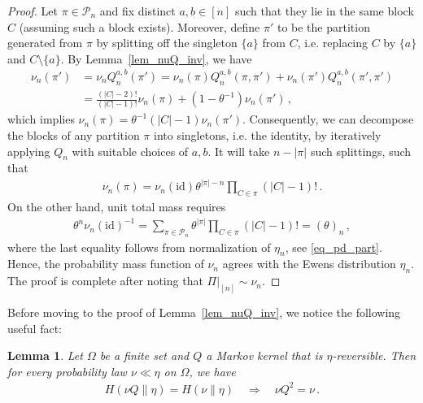 \documentclass[a4paper,11pt]{article}
\newcommand{\mP}{\mathcal{P}}
\numberwithin{equation}{section}
\newtheorem{lemma}[theorem]{Lemma}
\begin{document}
\begin{proof}
	Let $ \pi \in \mP_{n}$ and fix distinct $ a, b \in [n]$ such that they lie in the same block $C$ (assuming such a block exists). Moreover, define $ \pi' $ to be the partition generated from $ \pi$ by splitting off the singleton $\{a\}$ from $C$, i.e. replacing $ C$ by $ \{a\} $ and $C \setminus \{a\}$.
	By Lemma~\ref{lem_nuQ_inv}, we have 
	\begin{equation*}
	\begin{aligned}
	\nu_{n} ( \pi') 
	&= \nu_{n} Q^{a,b}_{n}( \pi') = 
	\nu_{n} ( \pi ) Q^{a,b}_{n} ( \pi, \pi'  )
	+	\nu_{n} ( \pi' ) Q^{a,b}_{n} ( \pi', \pi'  )\\
	&= 
	\frac{ (|C|-2)!}{(|C|-1)!}
	\nu_{n} ( \pi)
	+
	( 1- \theta^{-1})
	\nu_{n} ( \pi' )\,,
	\end{aligned}
	\end{equation*}
	which implies $ \nu_{n} ( \pi)= \theta^{-1} (|C|-1) \nu_{n}( \pi' )$.
	Consequently, we can decompose the blocks of any partition $ \pi$ into singletons, i.e. the identity, by iteratively applying $ Q_{n}$ with suitable choices of $a,b$. It will take $ n - | \pi|$ such splittings, such that 
\begin{equation*}
\begin{aligned}
	\nu_{n}( \pi)
	=
	\nu_{n} ( \mathrm{id})
	\theta^{| \pi| -n }
	\prod_{C  \in \pi} ( |C| -1)!	
  \,.
\end{aligned}
\end{equation*}
On the other hand, 
unit total mass requires 
\begin{equation*}
\begin{aligned}
\theta^{n} \nu_{n}( \mathrm{id})^{-1} 
= \sum_{\pi \in \mP_{n}} \theta^{ | \pi |} \prod_{C \in \pi}(|C| -1)!
= ( \theta)_{n} \,,
\end{aligned}
\end{equation*}
where the last equality follows from normalization of $\eta_n$, see \eqref{eq_pd_part}.
Hence, the probability mass function of $ \nu_{n}$ agrees with the Ewens distribution $ \eta_{n}$.
The proof is complete after noting that $ \Pi |_{[n]} \sim \nu_{n}$.
\end{proof}


Before moving to the proof of Lemma~\ref{lem_nuQ_inv}, we notice the following useful fact:

\begin{lemma}\label{lem_Q2}
Let $\Omega$ be a finite set and $ Q$ a Markov kernel that is $ \eta $-reversible. Then for every probability law $ \nu \ll \eta$ on $ \Omega$, we have
\begin{equation*}
\begin{aligned}
H ( \nu Q \| \eta) = H ( \nu \| \eta)\quad \Rightarrow \quad \nu Q^{2} = \nu\,.
\end{aligned}
\end{equation*}
\end{lemma}
\end{document}
